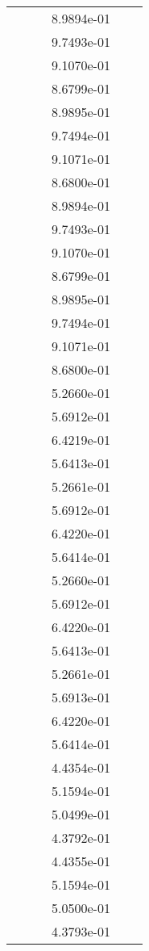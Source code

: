 \begin{xltabular}{\textwidth}{r|rS[table-format=1.3e+2]S[table-format=1.4e+2]S[table-format=1.4e+2]S[table-format=-1.5]}
&  &  & 8.9894e-01 & & \\
&  &  & 9.7493e-01 & & \\
&  &  & 9.1070e-01 & & \\
&  &  & 8.6799e-01 & & \\
&  &  & 8.9895e-01 & & \\
&  &  & 9.7494e-01 & & \\
&  &  & 9.1071e-01 & & \\
&  &  & 8.6800e-01 & & \\
&  &  & 8.9894e-01 & & \\
&  &  & 9.7493e-01 & & \\
&  &  & 9.1070e-01 & & \\
&  &  & 8.6799e-01 & & \\
&  &  & 8.9895e-01 & & \\
&  &  & 9.7494e-01 & & \\
&  &  & 9.1071e-01 & & \\
&  &  & 8.6800e-01 & & \\
&  &  & 5.2660e-01 & & \\
&  &  & 5.6912e-01 & & \\
&  &  & 6.4219e-01 & & \\
&  &  & 5.6413e-01 & & \\
&  &  & 5.2661e-01 & & \\
&  &  & 5.6912e-01 & & \\
&  &  & 6.4220e-01 & & \\
&  &  & 5.6414e-01 & & \\
&  &  & 5.2660e-01 & & \\
&  &  & 5.6912e-01 & & \\
&  &  & 6.4220e-01 & & \\
&  &  & 5.6413e-01 & & \\
&  &  & 5.2661e-01 & & \\
&  &  & 5.6913e-01 & & \\
&  &  & 6.4220e-01 & & \\
&  &  & 5.6414e-01 & & \\
&  &  & 4.4354e-01 & & \\
&  &  & 5.1594e-01 & & \\
&  &  & 5.0499e-01 & & \\
&  &  & 4.3792e-01 & & \\
&  &  & 4.4355e-01 & & \\
&  &  & 5.1594e-01 & & \\
&  &  & 5.0500e-01 & & \\
&  &  & 4.3793e-01 & & \\

\end{xltabular}
